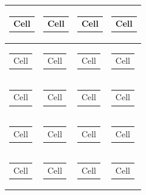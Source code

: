 \begin{longtable}{|l|l|l|l|}
\begin{tabular}[c]{@{}l@{}} Cell \end{tabular} &
\begin{tabular}[c]{@{}l@{}} Cell \end{tabular} &
\begin{tabular}[c]{@{}l@{}} Cell \end{tabular} & 
\begin{tabular}[c]{@{}l@{}} Cell \end{tabular} \\ \hline

\begin{tabular}[c]{@{}l@{}} Cell \end{tabular} &
\begin{tabular}[c]{@{}l@{}} Cell \end{tabular} &
\begin{tabular}[c]{@{}l@{}} Cell \end{tabular} & 
\begin{tabular}[c]{@{}l@{}} Cell \end{tabular} \\ \hline

\begin{tabular}[c]{@{}l@{}} Cell \end{tabular} &
\begin{tabular}[c]{@{}l@{}} Cell \end{tabular} &
\begin{tabular}[c]{@{}l@{}} Cell \end{tabular} & 
\begin{tabular}[c]{@{}l@{}} Cell \end{tabular} \\ \hline

\begin{tabular}[c]{@{}l@{}} Cell \end{tabular} &
\begin{tabular}[c]{@{}l@{}} Cell \end{tabular} &
\begin{tabular}[c]{@{}l@{}} Cell \end{tabular} & 
\begin{tabular}[c]{@{}l@{}} Cell \end{tabular} \\ \hline

\begin{tabular}[c]{@{}l@{}} Cell \end{tabular} &
\begin{tabular}[c]{@{}l@{}} Cell \end{tabular} &
\begin{tabular}[c]{@{}l@{}} Cell \end{tabular} & 
\begin{tabular}[c]{@{}l@{}} Cell \end{tabular} \\ \hline


\end{longtable}
